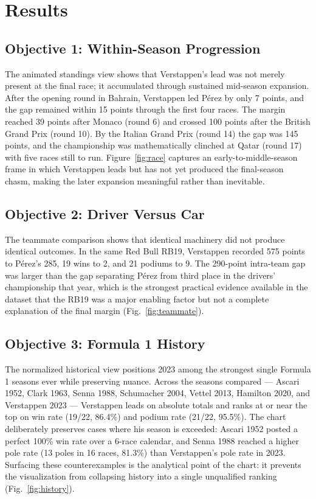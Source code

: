 \documentclass[conference]{IEEEtran}
\begin{document}
\section{Results}

\subsection{Objective 1: Within-Season Progression}
The animated standings view shows that Verstappen's lead was not merely present at the final race; it accumulated through sustained mid-season expansion. After the opening round in Bahrain, Verstappen led P\'erez by only 7 points, and the gap remained within 15 points through the first four races. The margin reached 39 points after Monaco (round 6) and crossed 100 points after the British Grand Prix (round 10). By the Italian Grand Prix (round 14) the gap was 145 points, and the championship was mathematically clinched at Qatar (round 17) with five races still to run. Figure~\ref{fig:race} captures an early-to-middle-season frame in which Verstappen leads but has not yet produced the final-season chasm, making the later expansion meaningful rather than inevitable.

\subsection{Objective 2: Driver Versus Car}
The teammate comparison shows that identical machinery did not produce identical outcomes. In the same Red Bull RB19, Verstappen recorded 575 points to P\'erez's 285, 19 wins to 2, and 21 podiums to 9. The 290-point intra-team gap was larger than the gap separating P\'erez from third place in the drivers' championship that year, which is the strongest practical evidence available in the dataset that the RB19 was a major enabling factor but not a complete explanation of the final margin (Fig.~\ref{fig:teammate}).

\subsection{Objective 3: Formula 1 History}
The normalized historical view positions 2023 among the strongest single Formula 1 seasons ever while preserving nuance. Across the seasons compared --- Ascari 1952, Clark 1963, Senna 1988, Schumacher 2004, Vettel 2013, Hamilton 2020, and Verstappen 2023 --- Verstappen leads on absolute totals and ranks at or near the top on win rate (19/22, 86.4\%) and podium rate (21/22, 95.5\%). The chart deliberately preserves cases where his season is exceeded: Ascari 1952 posted a perfect 100\% win rate over a 6-race calendar, and Senna 1988 reached a higher pole rate (13 poles in 16 races, 81.3\%) than Verstappen's pole rate in 2023. Surfacing these counterexamples is the analytical point of the chart: it prevents the visualization from collapsing history into a single unqualified ranking (Fig.~\ref{fig:history}).
\end{document}
